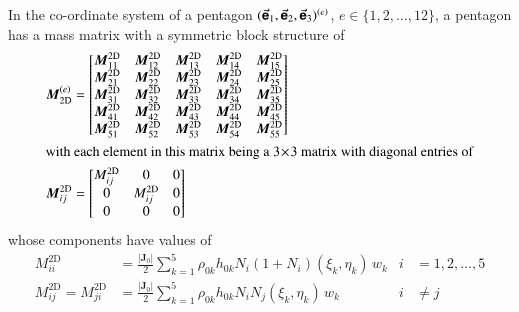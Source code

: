 In the co-ordinate system of a pentagon $( \vec{\boldsymbol{\mathsf{e}}}_1 , \vec{\boldsymbol{\mathsf{e}}}_2 , \vec{\boldsymbol{\mathsf{e}}}_3  )^{(e)}$, $e \in \{ 1, 2, \ldots, 12 \}$, a pentagon has a mass matrix with a symmetric block structure of
\begin{subequations}
    \begin{align}
    \boldsymbol{M}^{(e)}_{\mathrm{2D}} & = 
    \begin{bmatrix}
    \boldsymbol{M}^{\mathrm{2D}}_{11} & \boldsymbol{M}^{\mathrm{2D}}_{12} & 
    \boldsymbol{M}^{\mathrm{2D}}_{13} & \boldsymbol{M}^{\mathrm{2D}}_{14} & 
    \boldsymbol{M}^{\mathrm{2D}}_{15} \\
    \boldsymbol{M}^{\mathrm{2D}}_{21} & \boldsymbol{M}^{\mathrm{2D}}_{22} & 
    \boldsymbol{M}^{\mathrm{2D}}_{23} & \boldsymbol{M}^{\mathrm{2D}}_{24} & 
    \boldsymbol{M}^{\mathrm{2D}}_{25} \\
    \boldsymbol{M}^{\mathrm{2D}}_{31} & \boldsymbol{M}^{\mathrm{2D}}_{32} & 
    \boldsymbol{M}^{\mathrm{2D}}_{33} & \boldsymbol{M}^{\mathrm{2D}}_{34} & 
    \boldsymbol{M}^{\mathrm{2D}}_{35} \\
    \boldsymbol{M}^{\mathrm{2D}}_{41} & \boldsymbol{M}^{\mathrm{2D}}_{42} & 
    \boldsymbol{M}^{\mathrm{2D}}_{43} & \boldsymbol{M}^{\mathrm{2D}}_{44} & 
    \boldsymbol{M}^{\mathrm{2D}}_{45} \\ 
    \boldsymbol{M}^{\mathrm{2D}}_{51} & \boldsymbol{M}^{\mathrm{2D}}_{52} & 
    \boldsymbol{M}^{\mathrm{2D}}_{53} & \boldsymbol{M}^{\mathrm{2D}}_{54} & 
    \boldsymbol{M}^{\mathrm{2D}}_{55}
    \end{bmatrix} \\
    \intertext{with each element in this matrix being a $3 \! \times \! 3$ matrix with diagonal entries of}
    \boldsymbol{M}^{\mathrm{2D}}_{ij} & = 
    \begin{bmatrix}
    M^{\mathrm{2D}}_{ij} & 0 & 0 \\
    0 & M^{\mathrm{2D}}_{ij} & 0 \\
    0 & 0 & 0
    \end{bmatrix}
    \end{align}
\end{subequations}
whose components have values of
\begin{subequations}
    \begin{align}
    M_{ii}^{\mathrm{2D}} & = 
    \frac{| \mathbf{J}_0 |}{2} \sum_{k=1}^5 \rho_{0k} h_{0k} N_i ( 1 + 
    N_i ) ( \xi_k , \eta_k ) \, w_k & i & = 1,2,\ldots,5 \\
    M_{ij}^{\mathrm{2D}} = M_{ji}^{\mathrm{2D}} & =
    \frac{| \mathbf{J}_0 |}{2} \sum_{k=1}^5 \rho_{0k} h_{0k}
    N_i N_j (\xi_k , \eta_k ) \, w_k & i & \neq j
    \end{align}
\end{subequations}
